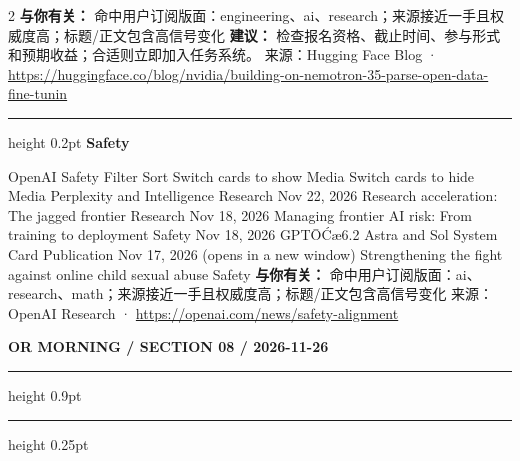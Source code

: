 \documentclass[10.5pt]{ctexart}
\begin{document}
\begin{multicols}{2}
\textbf{与你有关：} 命中用户订阅版面：engineering、ai、research；来源接近一手且权威度高；标题/正文包含高信号变化
\textbf{建议：} 检查报名资格、截止时间、参与形式和预期收益；合适则立即加入任务系统。
{\footnotesize\color{ormuted} 来源：Hugging Face Blog · \url{https://huggingface.co/blog/nvidia/building-on-nemotron-35-parse-open-data-fine-tunin}}
\vspace{2mm}
\hrule height 0.2pt
\vspace{2mm}
{\large\bfseries Safety}\par
OpenAI Safety Filter Sort Switch cards to show Media Switch cards to hide Media Perplexity and Intelligence Research Nov 22, 2026 Research acceleration: The jagged frontier Research Nov 18, 2026 Managing frontier AI risk: From training to deployment Safety Nov 18, 2026 GPTŌĆæ6.2 Astra and Sol System Card Publication Nov 17, 2026 (opens in a new window) Strengthening the fight against online child sexual abuse Safety 
\textbf{与你有关：} 命中用户订阅版面：ai、research、math；来源接近一手且权威度高；标题/正文包含高信号变化
{\footnotesize\color{ormuted} 来源：OpenAI Research · \url{https://openai.com/news/safety-alignment}}
\end{multicols}
\newpage
{\small\bfseries OR MORNING / SECTION 08 / 2026-11-26}
\vspace{2mm}
\hrule height 0.9pt
\vspace{1.5mm}
\hrule height 0.25pt
\vspace{4mm}
\end{document}
